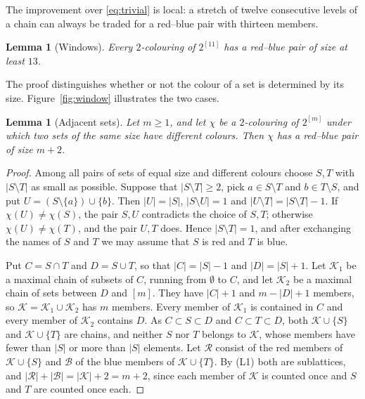\documentclass[11pt,reqno]{amsart}
\numberwithin{equation}{section}
\theoremstyle{plain}
\newtheorem{lemma}[theorem]{Lemma}
\theoremstyle{definition}
\theoremstyle{remark}
\newcommand{\cB}{\mathcal{B}}
\newcommand{\cK}{\mathcal{K}}
\newcommand{\cR}{\mathcal{R}}
\begin{document}
The improvement over \eqref{eq:trivial} is local: a stretch of twelve
consecutive levels of a chain can always be traded for a red--blue pair
with thirteen members.

\begin{lemma}[Windows]
\label{lem:window}
Every $2$-colouring of $2^{[11]}$ has a red--blue pair of size at least
$13$.
\end{lemma}

The proof distinguishes whether or not the colour of a set is determined
by its size. Figure~\ref{fig:window} illustrates the two cases.

\begin{lemma}[Adjacent sets]
\label{lem:adjacent}
Let $m\ge1$, and let $\chi$ be a $2$-colouring of $2^{[m]}$ under which
two sets of the same size have different colours. Then $\chi$ has a
red--blue pair of size $m+2$.
\end{lemma}

\begin{proof}
Among all pairs of sets of equal size and different colours choose $S,T$
with $|S\setminus T|$ as small as possible. Suppose that $|S\setminus
T|\ge2$, pick $a\in S\setminus T$ and $b\in T\setminus S$, and put
$U=(S\setminus\{a\})\cup\{b\}$. Then $|U|=|S|$, $|S\setminus U|=1$ and
$|U\setminus T|=|S\setminus T|-1$. If $\chi(U)\ne\chi(S)$, the pair $S,U$
contradicts the choice of $S,T$; otherwise $\chi(U)\ne\chi(T)$, and the
pair $U,T$ does. Hence $|S\setminus T|=1$, and after exchanging the names
of $S$ and $T$ we may assume that $S$ is red and $T$ is blue.

Put $C=S\cap T$ and $D=S\cup T$, so that $|C|=|S|-1$ and $|D|=|S|+1$.
Let $\cK_1$ be a maximal chain of subsets of $C$, running from
$\emptyset$ to $C$, and let $\cK_2$ be a maximal chain of sets between $D$
and $[m]$. They have $|C|+1$ and $m-|D|+1$ members, so
$\cK=\cK_1\cup\cK_2$ has $m$ members. Every member of $\cK_1$ is contained
in $C$ and every member of $\cK_2$ contains $D$. As $C\subset S\subset D$
and $C\subset T\subset D$, both $\cK\cup\{S\}$ and $\cK\cup\{T\}$ are
chains, and neither $S$ nor $T$ belongs to $\cK$, whose members have
fewer than $|S|$ or more than $|S|$ elements. Let $\cR$ consist of the red
members of $\cK\cup\{S\}$ and $\cB$ of the blue members of
$\cK\cup\{T\}$. By (L1) both are sublattices, and $|\cR|+|\cB|=|\cK|+2=
m+2$, since each member of $\cK$ is counted once and $S$ and $T$ are
counted once each.
\end{proof}
\end{document}
